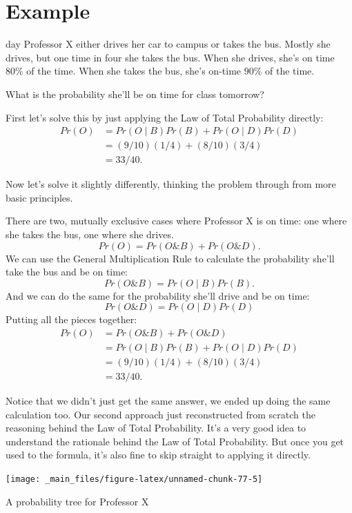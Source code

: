 \documentclass[justified]{tufte-book}
\newcommand{\given}{\mid}
\renewcommand{\wedge}{\mathbin{\&}}
\newcommand{\p}{Pr}
\theoremstyle{definition}
\theoremstyle{definition}
\theoremstyle{definition}
\theoremstyle{remark}
\begin{document}
\hypertarget{example}{%
\section{Example}\label{example}}

 day Professor X either drives her car to campus or
takes the bus. Mostly she drives, but one time in four she takes the
bus. When she drives, she's on time \(80\%\) of the time. When she takes
the bus, she's on-time \(90\%\) of the time.

What is the probability she'll be on time for class tomorrow?

First let's solve this by just applying the Law of Total Probability
directly: \[
  \begin{aligned}
    \p(O) &= \p(O \given B)\p(B) + \p(O \given D)\p(D)\\
          &= (9/10)(1/4) + (8/10)(3/4)\\
          &= 33/40.
  \end{aligned}
\]

Now let's solve it slightly differently, thinking the problem through
from more basic principles.

There are two, mutually exclusive cases where Professor X is on time:
one where she takes the bus, one where she drives.
\[ \p(O) = \p(O \wedge B) + \p(O \wedge D). \] We can use the General
Multiplication Rule to calculate the probability she'll take the bus and
be on time: \[ \p(O \wedge B) = \p(O \given B)\p(B). \] And we can do
the same for the probability she'll drive and be on time:
\[ \p(O \wedge D) = \p(O \given D)\p(D)\] Putting all the pieces
together: \[
  \begin{aligned}
    \p(O) &= \p(O \wedge B) + \p(O \wedge D)\\
          &= \p(O \given B)\p(B) + \p(O \given D)\p(D)\\
          &= (9/10)(1/4) + (8/10)(3/4)\\
          &= 33/40.
  \end{aligned}
\]

Notice that we didn't just get the same answer, we ended up doing the
same calculation too. Our second approach just reconstructed from
scratch the reasoning behind the Law of Total Probability. It's a very
good idea to understand the rationale behind the Law of Total
Probability. But once you get used to the formula, it's also fine to
skip straight to applying it directly.

\begin{marginfigure}
\texttt{[image: \_main\_files/figure-latex/unnamed-chunk-77-5]} \caption[A probability tree for Professor X]{A probability tree for Professor X}\label{fig:unnamed-chunk-77}
\end{marginfigure}
\end{document}
